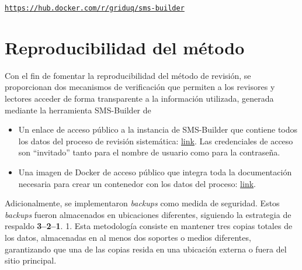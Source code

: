\begin{center}
\href{https://hub.docker.com/r/griduq/sms-builder}{\texttt{https://hub.docker.com/r/griduq/sms-builder}}
\end{center}



\section{Reproducibilidad del método}
\noindent
Con el fin de fomentar la reproducibilidad del método de revisión, se proporcionan dos mecanismos de verificación que permiten a los revisores y lectores acceder de forma transparente a la información utilizada, generada mediante la herramienta SMS-Builder de~\cite{SMSBuilder2020}
\begin{itemize}
  \item Un enlace de acceso público a la instancia de SMS-Builder que contiene todos los datos del proceso de revisión sistemática: \href{https://sms-vbc.iti.grid.uniquindio.edu.co/sms.xhtml}{link}. Las credenciales de acceso son ``invitado'' tanto para el nombre de usuario como para la contraseña.
  \item Una imagen de Docker de acceso público que integra toda la documentación necesaria para crear un contenedor con los datos del proceso: \href{https://hub.docker.com/r/anubis1001/tg-vbc-sms-builder}{link}.
\end{itemize}

\noindent
Adicionalmente, se implementaron \textit{backups} como medida de seguridad. Estos \textit{backups} fueron almacenados en ubicaciones diferentes, siguiendo la estrategia de respaldo \textbf{3--2--1}. 1. Esta metodología consiste en mantener tres copias totales de los datos, almacenadas en al menos dos soportes o medios diferentes, garantizando que una de las copias resida en una ubicación externa o fuera del sitio principal.

